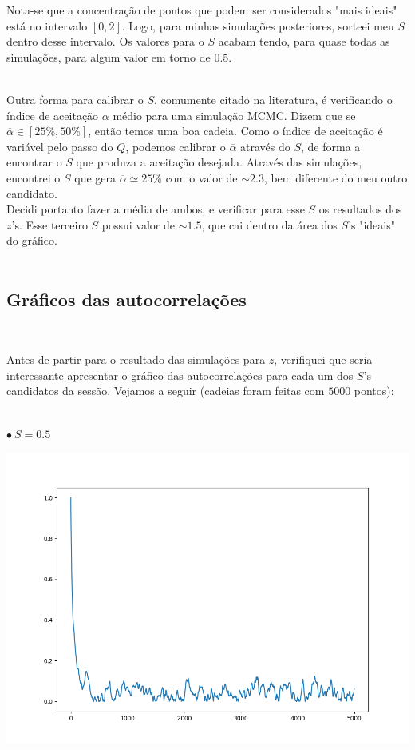 \documentclass[pt12]{article}
\begin{document}
\newpage

Nota-se que a concentração de pontos que podem ser considerados "mais ideais" está no intervalo $[0,2]$. Logo, para minhas simulações posteriores, sorteei meu $S$ dentro desse intervalo. Os valores para o $S$ acabam tendo, para quase todas as simulações, para algum valor em torno de $0.5$.\\
\

Outra forma para calibrar o $S$, comumente citado na literatura, é verificando o índice de aceitação $\alpha$ médio para uma simulação MCMC. Dizem que se $\overline{\alpha} \in [25\% , 50\%]$, então temos uma boa cadeia. Como o índice de aceitação é variável pelo passo do $Q$, podemos calibrar o $\overline{\alpha}$ através do $S$, de forma a encontrar o $S$ que produza a aceitação desejada. Através das simulações, encontrei o $S$ que gera $\overline{\alpha}\simeq 25\%$ com o valor de $\sim 2.3$, bem diferente do meu outro candidato.\\

Decidi portanto fazer a média de ambos, e verificar para esse $S$ os resultados dos $z$'s. Esse terceiro $S$ possui valor de $\sim 1.5$, que cai dentro da área dos $S$'s "ideais" do gráfico.\\
\ 

\subsection{Gráficos das autocorrelações}
\ 

Antes de partir para o resultado das simulações para $z$, verifiquei que seria interessante apresentar o gráfico das autocorrelações para cada um dos $S$'s candidatos da sessão. Vejamos a seguir (cadeias foram feitas com $5000$ pontos):\\
\ 

\begin{small} $\bullet \ S = 0.5$ \end{small}
\begin{center} \includegraphics[scale=0.6]{Autocorrelacao_sig_0_5.png} \end{center}
\newpage
\end{document}
